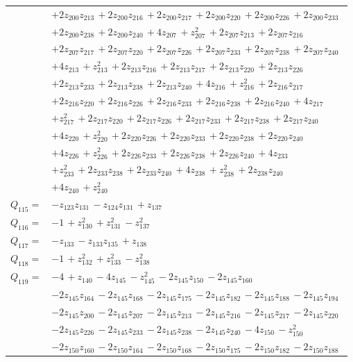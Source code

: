 \begin{longtable}{@{}r p{0.88\linewidth}@{}}
 & $+2z_{200}z_{213}\,+2z_{200}z_{216}\,+2z_{200}z_{217}\,+2z_{200}z_{220}\,+2z_{200}z_{226}\,+2z_{200}z_{233}$\\
 & $+2z_{200}z_{238}\,+2z_{200}z_{240}\,+4z_{207}\,+z_{207}^{2}\,+2z_{207}z_{213}\,+2z_{207}z_{216}$\\
 & $+2z_{207}z_{217}\,+2z_{207}z_{220}\,+2z_{207}z_{226}\,+2z_{207}z_{233}\,+2z_{207}z_{238}\,+2z_{207}z_{240}$\\
 & $+4z_{213}\,+z_{213}^{2}\,+2z_{213}z_{216}\,+2z_{213}z_{217}\,+2z_{213}z_{220}\,+2z_{213}z_{226}$\\
 & $+2z_{213}z_{233}\,+2z_{213}z_{238}\,+2z_{213}z_{240}\,+4z_{216}\,+z_{216}^{2}\,+2z_{216}z_{217}$\\
 & $+2z_{216}z_{220}\,+2z_{216}z_{226}\,+2z_{216}z_{233}\,+2z_{216}z_{238}\,+2z_{216}z_{240}\,+4z_{217}$\\
 & $+z_{217}^{2}\,+2z_{217}z_{220}\,+2z_{217}z_{226}\,+2z_{217}z_{233}\,+2z_{217}z_{238}\,+2z_{217}z_{240}$\\
 & $+4z_{220}\,+z_{220}^{2}\,+2z_{220}z_{226}\,+2z_{220}z_{233}\,+2z_{220}z_{238}\,+2z_{220}z_{240}$\\
 & $+4z_{226}\,+z_{226}^{2}\,+2z_{226}z_{233}\,+2z_{226}z_{238}\,+2z_{226}z_{240}\,+4z_{233}$\\
 & $+z_{233}^{2}\,+2z_{233}z_{238}\,+2z_{233}z_{240}\,+4z_{238}\,+z_{238}^{2}\,+2z_{238}z_{240}$\\
 & $+4z_{240}\,+z_{240}^{2}$\\[5pt]
$Q_{115}=$ & $-z_{123}z_{131}\,-z_{124}z_{131}\,+z_{137}$\\[5pt]
$Q_{116}=$ & $-1\,+z_{130}^{2}\,+z_{131}^{2}\,-z_{137}^{2}$\\[5pt]
$Q_{117}=$ & $-z_{133}\,-z_{133}z_{135}\,+z_{138}$\\[5pt]
$Q_{118}=$ & $-1\,+z_{132}^{2}\,+z_{133}^{2}\,-z_{138}^{2}$\\[5pt]
$Q_{119}=$ & $-4\,+z_{140}\,-4z_{145}\,-z_{145}^{2}\,-2z_{145}z_{150}\,-2z_{145}z_{160}$\\
 & $-2z_{145}z_{164}\,-2z_{145}z_{168}\,-2z_{145}z_{175}\,-2z_{145}z_{182}\,-2z_{145}z_{188}\,-2z_{145}z_{194}$\\
 & $-2z_{145}z_{200}\,-2z_{145}z_{207}\,-2z_{145}z_{213}\,-2z_{145}z_{216}\,-2z_{145}z_{217}\,-2z_{145}z_{220}$\\
 & $-2z_{145}z_{226}\,-2z_{145}z_{233}\,-2z_{145}z_{238}\,-2z_{145}z_{240}\,-4z_{150}\,-z_{150}^{2}$\\
 & $-2z_{150}z_{160}\,-2z_{150}z_{164}\,-2z_{150}z_{168}\,-2z_{150}z_{175}\,-2z_{150}z_{182}\,-2z_{150}z_{188}$\\

\end{longtable}
